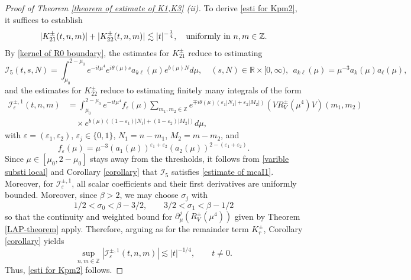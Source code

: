 \documentclass[reqno, 11pt]{amsart}
\newcommand\R{\mathbb{R}}
\newcommand\Z{\mathbb{Z}}
\newcommand\mcaI{\mathcal{I}}
\numberwithin{equation}{section}
\begin{document}
\begin{proof}[Proof of Theorem \ref{theorem of estimate of K1,K3} (ii)]
To derive \eqref{esti for Kpm2}, it suffices to establish
\begin{align}\label{estimate for kpm21 kpm22}
|K^{\pm}_{21}(t,n,m)|+|K^{\pm}_{22}(t,n,m)|\lesssim |t|^{-\frac{1}{4}}, \quad {\rm uniformly\ in}\ n,m\in\Z.
\end{align}
By \eqref{kernel of R0 boundary}, the estimates for $K^{\pm}_{21}$ reduce to estimating 
\begin{equation*}
\mcaI_{5}(t,s,N)=\int_{\mu_0}^{2-\mu_0}e^{-it\mu^4}e^{i\theta(\mu)s}a_{k\ell}(\mu)e^{b(\mu)N}d\mu,\quad (s,N)\in \R\times [0,\infty),\ \ a_{k\ell}(\mu)=\mu^{-3}a_k(\mu)a_{\ell}(\mu),
\end{equation*}
and the estimates for $K^{\pm}_{22}$ reduce to estimating finitely many integrals of the form
\begin{align*}
\mcaI^{\pm,1}_{\varepsilon}(t,n,m)&=\int_{\mu_0}^{2-\mu_0}e^{-it\mu^4}f_{\varepsilon}(\mu)\sum\limits_{m_1,m_2\in\Z}e^{\mp i\theta(\mu)(\varepsilon_1|{N}_1|+\varepsilon_2|{M}_2|)}(VR^{\pm}_V(\mu^4)V)(m_1,m_2)\\
&\quad\times e^{b(\mu)((1-\varepsilon_1)|{N}_1|+(1-\varepsilon_2)|{M}_2|)}d\mu,
\end{align*}
with $\varepsilon=(\varepsilon_1,\varepsilon_2)$, $\varepsilon_j\in\{0,1\}$, ${N}_1=n-m_1$, ${M}_2=m-m_2$, and 
\begin{equation*}
    f_{\varepsilon}(\mu)=\mu^{-3}(a_1(\mu))^{\varepsilon_1+\varepsilon_2}(a_2(\mu))^{2-(\varepsilon_1+\varepsilon_2)}.
\end{equation*}
Since $\mu\in[\mu_0,2-\mu_0]$ stays away from the thresholds, it follows from \eqref{varible substi local} and Corollary \ref{corollary} that $\mcaI_5$ satisfies \eqref{estimate of mcaI1}.
Moreover, for $\mcaI^{\pm,1}_{\varepsilon}$, all scalar coefficients and their first derivatives are uniformly bounded. Moreover, since $\beta>2$, we may choose $\sigma_j$ with
$$1/2<\sigma_0<\beta-3/2,\qquad 3/2<\sigma_1<\beta-1/2$$
so that the continuity and weighted bound for $\partial^{j}_\mu (R_V^\pm(\mu^4))$ given by Theorem \ref{LAP-theorem} apply. 
Therefore, arguing as for the remainder term $K^{\pm}_r$, Corollary \ref{corollary} yields 
\begin{equation*}
\sup\limits_{n,m\in\Z}|\mcaI^{\pm,1}_{\varepsilon}(t,n,m)|\lesssim |t|^{-1/4},\qquad t\neq0.
\end{equation*}
Thus, \eqref{esti for Kpm2} follows.
\end{proof}
\end{document}
